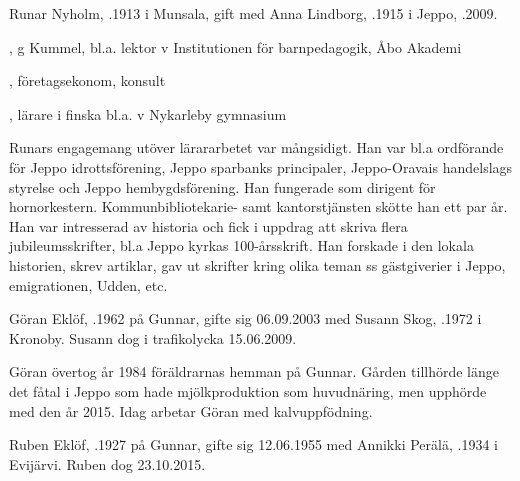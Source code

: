 Runar Nyholm, .1913 i Munsala, gift med Anna Lindborg, .1915 i Jeppo, .2009.
\begin{jhchildren}
  \item {}, g Kummel, bl.a. lektor v Institutionen för barnpedagogik, Åbo Akademi
  \item {}, företagsekonom, konsult
  \item {}, lärare i finska bl.a. v Nykarleby gymnasium
\end{jhchildren}

Runars engagemang utöver lärararbetet var mångsidigt. Han var bl.a ordförande för  Jeppo idrottsförening, Jeppo sparbanks principaler, Jeppo-Oravais handelslags styrelse och Jeppo hembygdsförening. Han fungerade som dirigent för hornorkestern. Kommunbibliotekarie- samt kantorstjänsten skötte han ett par år. Han var intresserad av historia och fick i uppdrag att skriva flera jubileumsskrifter, bl.a Jeppo kyrkas 100-årsskrift. Han forskade i den lokala historien, skrev artiklar, gav ut skrifter kring olika teman ss gästgiverier i Jeppo, emigrationen, Udden, etc.






Göran Eklöf, .1962 på Gunnar, gifte sig 06.09.2003 med Susann Skog, .1972 i Kronoby. Susann dog i trafikolycka 15.06.2009.
\begin{jhchildren}
  \item {}
  \item {}
\end{jhchildren}

Göran övertog år 1984  föräldrarnas hemman på Gunnar. Gården tillhörde länge det fåtal i Jeppo som hade mjölkproduktion som huvudnäring, men upphörde med den år 2015. Idag arbetar Göran med kalvuppfödning.


Ruben Eklöf,  .1927 på Gunnar, gifte sig 12.06.1955 med Annikki  Perälä,  .1934 i Evijärvi. Ruben dog 23.10.2015.
\begin{jhchildren}
  \item {}
  \item {}
\end{jhchildren}

